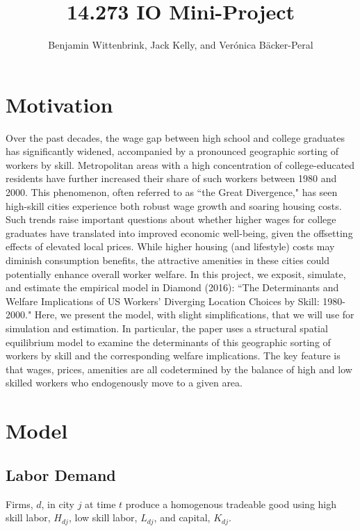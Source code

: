 \documentclass{article}
\title{14.273 IO Mini-Project}
\author{Benjamin Wittenbrink, Jack Kelly, and Verónica Bäcker-Peral}
\begin{document}
\maketitle

\section{Motivation}

Over the past decades, the wage gap between high school and college graduates has significantly widened, accompanied by a pronounced geographic sorting of workers by skill. Metropolitan areas with a high concentration of college-educated residents have further increased their share of such workers between 1980 and 2000. This phenomenon, often referred to as ``the Great Divergence," has seen high-skill cities experience both robust wage growth and soaring housing costs. Such trends raise important questions about whether higher wages for college graduates have translated into improved economic well-being, given the offsetting effects of elevated local prices. While higher housing (and lifestyle) costs may diminish consumption benefits, the attractive amenities in these cities could potentially enhance overall worker welfare. In this project, we exposit, simulate, and estimate the empirical model in Diamond (2016): ``The Determinants and Welfare Implications of US Workers' Diverging Location Choices by Skill: 1980-2000." Here, we present the model, with slight simplifications, that we will use for simulation and estimation. 
In particular, the paper uses a structural spatial equilibrium model to examine the determinants of this geographic sorting of workers by skill and the corresponding welfare implications. The key feature is that wages, prices, amenities are all codetermined by the balance of high and low skilled workers who endogenously move to a given area. 

\section{Model}

\subsection{Labor Demand}
Firms, $d$, in city $j$ at time $t$ produce a homogenous tradeable good using high skill labor, $H_{dj}$, low skill labor, $L_{dj}$, and capital, $K_{dj}$. 
\end{document}
